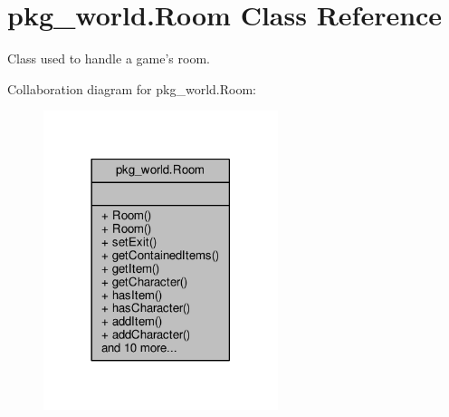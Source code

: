 \hypertarget{classpkg__world_1_1Room}{\section{pkg\-\_\-world.\-Room Class Reference}
\label{classpkg__world_1_1Room}
}


Class used to handle a game's room.  




Collaboration diagram for pkg\-\_\-world.\-Room\-:\nopagebreak
\begin{figure}[H]
\begin{center}
\leavevmode
\includegraphics[width=194pt]{classpkg__world_1_1Room__coll__graph}
\end{center}
\end{figure}
